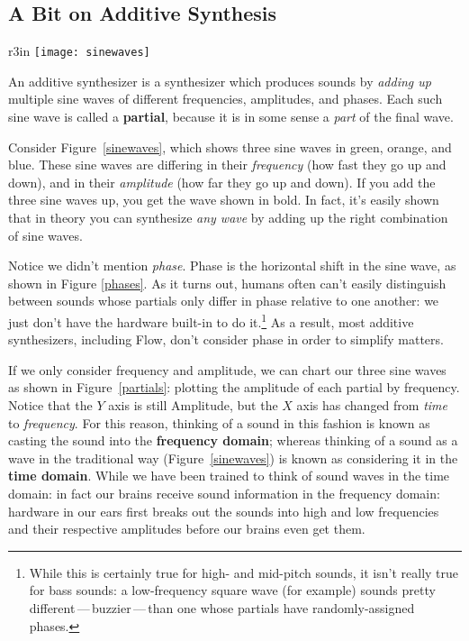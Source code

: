 \documentclass{article}
\newcommand\name{Flow}
\begin{document}
\subsection{A Bit on Additive Synthesis}  
\label{additivesynthesis}

\begin{wrapfigure}{r}{3in}
\vspace{-1em}
\texttt{[image: sinewaves]}
\caption{Three sine waves (colored) and the result of adding them up (in bold).}
\label{sinewaves}
\vspace{-1em}
\end{wrapfigure}

An additive synthesizer is a synthesizer which produces sounds by {\it adding up} multiple sine waves of different frequencies, amplitudes, and phases.  Each such sine wave is called a {\bf partial}, because it is in some sense a {\it part} of the final wave.

Consider Figure~\ref{sinewaves}, which shows three sine waves in green, orange, and blue.  These sine waves are differing in their {\it frequency} (how fast they go up and down), and in their {\it amplitude} (how far they go up and down).  If you add the three sine waves up, you get the wave shown in bold.  In fact, it's easily shown that in theory you can synthesize {\it any wave} by adding up the right combination of sine waves.

Notice we didn't mention {\it phase}.  Phase is the horizontal shift in the sine wave, as shown in Figure \ref{phases}.  As it turns out, humans often can't easily distinguish between sounds whose partials only differ in phase relative to one another: we just don't have the hardware built-in to do it.\footnote{While this is certainly true for high- and mid-pitch sounds, it isn't really true for bass sounds: a low-frequency square wave (for example) sounds pretty different\,---\,buzzier\,---\,than one whose partials have randomly-assigned phases.}   As a result, most additive synthesizers, including {\name}, don't consider phase in order to simplify matters.

If we only consider frequency and amplitude, we can chart our three sine waves as shown in Figure~\ref{partials}: plotting the amplitude of each partial by frequency.  Notice that the \(Y\) axis is still Amplitude, but the \(X\) axis has changed from {\it time} to {\it frequency}. For this reason, thinking of a sound in this fashion is known as casting the sound into the {\bf frequency domain}; whereas thinking of a sound as a wave in the traditional way (Figure~\ref{sinewaves}) is known as considering it in the {\bf time domain}.  While we have been trained to think of sound waves in the time domain: in fact our brains receive sound information in the frequency domain: hardware in our ears first breaks out the sounds into high and low frequencies and their respective amplitudes before our brains even get them.
\end{document}
